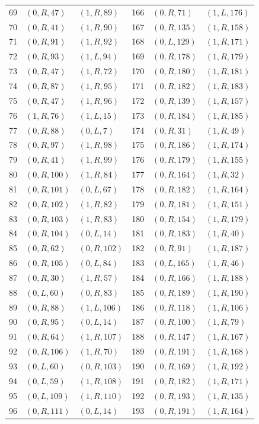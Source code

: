 \begin{longtable}{r@{\quad}ll@{\qquad}r@{\quad}ll}
69 & $(0,R,47)$ & $(1,R,89)$ & 166 & $(0,R,71)$ & $(1,L,176)$\\
70 & $(0,R,41)$ & $(1,R,90)$ & 167 & $(0,R,135)$ & $(1,R,158)$\\
71 & $(0,R,91)$ & $(1,R,92)$ & 168 & $(0,L,129)$ & $(1,R,171)$\\
72 & $(0,R,93)$ & $(1,L,94)$ & 169 & $(0,R,178)$ & $(1,R,179)$\\
73 & $(0,R,47)$ & $(1,R,72)$ & 170 & $(0,R,180)$ & $(1,R,181)$\\
74 & $(0,R,87)$ & $(1,R,95)$ & 171 & $(0,R,182)$ & $(1,R,183)$\\
75 & $(0,R,47)$ & $(1,R,96)$ & 172 & $(0,R,139)$ & $(1,R,157)$\\
76 & $(1,R,76)$ & $(1,L,15)$ & 173 & $(0,R,184)$ & $(1,R,185)$\\
77 & $(0,R,88)$ & $(0,L,7)$ & 174 & $(0,R,31)$ & $(1,R,49)$\\
78 & $(0,R,97)$ & $(1,R,98)$ & 175 & $(0,R,186)$ & $(1,R,174)$\\
79 & $(0,R,41)$ & $(1,R,99)$ & 176 & $(0,R,179)$ & $(1,R,155)$\\
80 & $(0,R,100)$ & $(1,R,84)$ & 177 & $(0,R,164)$ & $(1,R,32)$\\
81 & $(0,R,101)$ & $(0,L,67)$ & 178 & $(0,R,182)$ & $(1,R,164)$\\
82 & $(0,R,102)$ & $(1,R,82)$ & 179 & $(0,R,181)$ & $(1,R,151)$\\
83 & $(0,R,103)$ & $(1,R,83)$ & 180 & $(0,R,154)$ & $(1,R,179)$\\
84 & $(0,R,104)$ & $(0,L,14)$ & 181 & $(0,R,183)$ & $(1,R,40)$\\
85 & $(0,R,62)$ & $(0,R,102)$ & 182 & $(0,R,91)$ & $(1,R,187)$\\
86 & $(0,R,105)$ & $(0,L,84)$ & 183 & $(0,L,165)$ & $(1,R,46)$\\
87 & $(0,R,30)$ & $(1,R,57)$ & 184 & $(0,R,166)$ & $(1,R,188)$\\
88 & $(0,L,60)$ & $(0,R,83)$ & 185 & $(0,R,189)$ & $(1,R,190)$\\
89 & $(0,R,88)$ & $(1,L,106)$ & 186 & $(0,R,118)$ & $(1,R,106)$\\
90 & $(0,R,95)$ & $(0,L,14)$ & 187 & $(0,R,100)$ & $(1,R,79)$\\
91 & $(0,R,64)$ & $(1,R,107)$ & 188 & $(0,R,147)$ & $(1,R,167)$\\
92 & $(0,R,106)$ & $(1,R,70)$ & 189 & $(0,R,191)$ & $(1,R,168)$\\
93 & $(0,L,60)$ & $(0,R,103)$ & 190 & $(0,R,169)$ & $(1,R,192)$\\
94 & $(0,L,59)$ & $(1,R,108)$ & 191 & $(0,R,182)$ & $(1,R,171)$\\
95 & $(0,L,109)$ & $(1,R,110)$ & 192 & $(0,R,193)$ & $(1,R,135)$\\
96 & $(0,R,111)$ & $(0,L,14)$ & 193 & $(0,R,191)$ & $(1,R,164)$\\
\end{longtable}
\normalsize
\clearpage
